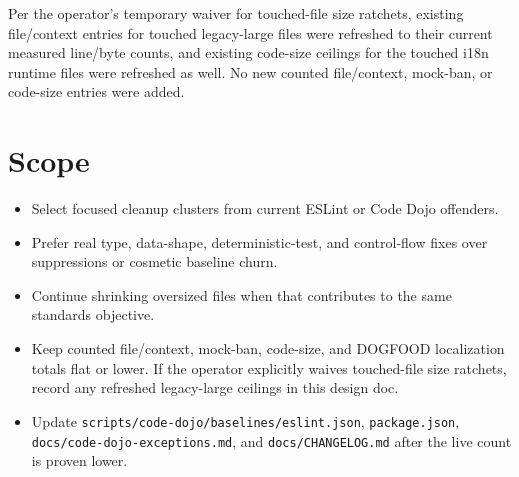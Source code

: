 Per the operator's temporary waiver for touched-file size ratchets, existing file/context entries for touched legacy-large files were refreshed to their current measured line/byte counts, and existing code-size ceilings for the touched i18n runtime files were refreshed as well. No new counted file/context, mock-ban, or code-size entries were added.

\section{Scope}\label{record-241-scope}

\begin{itemize}
\tightlist
\item
  Select focused cleanup clusters from current ESLint or Code Dojo offenders.
\item
  Prefer real type, data-shape, deterministic-test, and control-flow fixes over suppressions or cosmetic baseline churn.
\item
  Continue shrinking oversized files when that contributes to the same standards objective.
\item
  Keep counted file/context, mock-ban, code-size, and DOGFOOD localization totals flat or lower. If the operator explicitly waives touched-file size ratchets, record any refreshed legacy-large ceilings in this design doc.
\item
  Update \texttt{s\allowbreak{}c\allowbreak{}r\allowbreak{}i\allowbreak{}p\allowbreak{}t\allowbreak{}s\allowbreak{}/\allowbreak{}c\allowbreak{}o\allowbreak{}d\allowbreak{}e\allowbreak{}-\allowbreak{}d\allowbreak{}o\allowbreak{}j\allowbreak{}o\allowbreak{}/\allowbreak{}b\allowbreak{}a\allowbreak{}s\allowbreak{}e\allowbreak{}l\allowbreak{}i\allowbreak{}n\allowbreak{}e\allowbreak{}s\allowbreak{}/\allowbreak{}e\allowbreak{}s\allowbreak{}l\allowbreak{}i\allowbreak{}n\allowbreak{}t\allowbreak{}.\allowbreak{}j\allowbreak{}s\allowbreak{}o\allowbreak{}n}, \texttt{p\allowbreak{}a\allowbreak{}c\allowbreak{}k\allowbreak{}a\allowbreak{}g\allowbreak{}e\allowbreak{}.\allowbreak{}j\allowbreak{}s\allowbreak{}o\allowbreak{}n}, \texttt{d\allowbreak{}o\allowbreak{}c\allowbreak{}s\allowbreak{}/\allowbreak{}c\allowbreak{}o\allowbreak{}d\allowbreak{}e\allowbreak{}-\allowbreak{}d\allowbreak{}o\allowbreak{}j\allowbreak{}o\allowbreak{}-\allowbreak{}e\allowbreak{}x\allowbreak{}c\allowbreak{}e\allowbreak{}p\allowbreak{}t\allowbreak{}i\allowbreak{}o\allowbreak{}n\allowbreak{}s\allowbreak{}.\allowbreak{}m\allowbreak{}d}, and \texttt{d\allowbreak{}o\allowbreak{}c\allowbreak{}s\allowbreak{}/\allowbreak{}C\allowbreak{}H\allowbreak{}A\allowbreak{}N\allowbreak{}G\allowbreak{}E\allowbreak{}L\allowbreak{}O\allowbreak{}G\allowbreak{}.\allowbreak{}m\allowbreak{}d} after the live count is proven lower.
\end{itemize}


